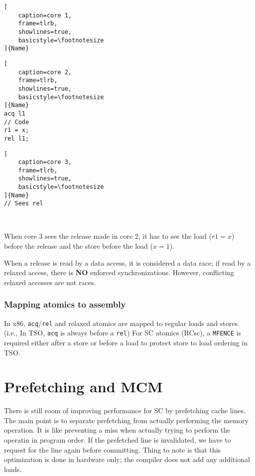 \documentclass{article}
\begin{document}
\begin{multicols*}{2}
\begin{minipage}{.15\textwidth}
\begin{lstlisting}[
    caption=core 1,
    frame=tlrb,
    showlines=true,
    basicstyle=\footnotesize
]{Name}
\end{lstlisting}
\end{minipage}\hfill
\begin{minipage}{.15\textwidth}
\captionsetup{labelformat=empty}
\begin{lstlisting}[
    caption=core 2,
    frame=tlrb,
    showlines=true,
    basicstyle=\footnotesize
]{Name}
acq l1
// Code
r1 = x;
rel l1;
\end{lstlisting}
\end{minipage}\hfill
\begin{minipage}{.15\textwidth}
\captionsetup{labelformat=empty}
\begin{lstlisting}[
    caption=core 3,
    frame=tlrb,
    showlines=true,
    basicstyle=\footnotesize
]{Name}
// Sees rel



\end{lstlisting}
\end{minipage}

\noindent\newline
When core 3 sees the release made in core 2, it has to see the load ($r1=x$) before the release and the store before the load ($x=1$).

\noindent\newline
When a release is read by a data access, it is considered a data race; if read by a relaxed access, there is \textbf{NO} enforced synchronizations. However, conflicting relaxed accesses are not races.

\subsubsection{Mapping atomics to assembly}
In x86, \texttt{acq}/\texttt{rel} and relaxed atomics are mapped to regular loads and stores. (i.e., In TSO, \texttt{acq} is always before a \texttt{rel}) For SC atomics (RCsc), a \texttt{MFENCE} is required either after a store or before a load to protect store to load ordering in TSO.

\section{Prefetching and MCM}
There is still room of improving performance for SC by prefetching cache lines. The main point is to separate prefetching from actually performing the memory operation. It is like preventing a miss when actually trying to perform the operatin in program order. If the prefetched line is invalidated, we have to request for the line again before committing. Thing to note is that this optimization is done in hardware only; the compiler does not add any additional loads.


\end{multicols*}
\end{document}
